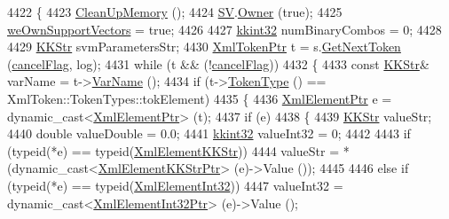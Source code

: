 \begin{DoxyCode}
4422 \{
4423   \hyperlink{struct_s_v_m289___m_f_s_1_1_svm___model_a38e71bae1b5829f722cbcb19eb3930b1}{CleanUpMemory} ();
4424   \hyperlink{struct_s_v_m289___m_f_s_1_1_svm___model_ab2ebe759ca5aabb85fc6deea03706f0a}{SV}.\hyperlink{class_k_k_b_1_1_k_k_queue_a4990d037ff09dd504cc7df53819bf61a}{Owner} (\textcolor{keyword}{true});
4425   \hyperlink{struct_s_v_m289___m_f_s_1_1_svm___model_a92c6022c1bf0e7094d7815692f3ec0e9}{weOwnSupportVectors} = \textcolor{keyword}{true};
4426 
4427   \hyperlink{namespace_k_k_b_a8fa4952cc84fda1de4bec1fbdd8d5b1b}{kkint32}  numBinaryCombos = 0;
4428 
4429   \hyperlink{class_k_k_b_1_1_k_k_str}{KKStr}  svmParametersStr;
4430   \hyperlink{class_k_k_b_1_1_xml_token}{XmlTokenPtr}  t = s.\hyperlink{class_k_k_b_1_1_xml_stream_a87cc738b05c666cf5d5c25beaab477b4}{GetNextToken} (\hyperlink{struct_s_v_m289___m_f_s_1_1_svm___model_a01645368f6800875543d69ce8731d692}{cancelFlag}, log);
4431   \textcolor{keywordflow}{while}  (t  &&  (!\hyperlink{struct_s_v_m289___m_f_s_1_1_svm___model_a01645368f6800875543d69ce8731d692}{cancelFlag}))
4432   \{
4433     \textcolor{keyword}{const} \hyperlink{class_k_k_b_1_1_k_k_str}{KKStr}& varName = t->\hyperlink{class_k_k_b_1_1_xml_token_a28b39cfdfa2ed63048a812b1cb52263c}{VarName} ();
4434     \textcolor{keywordflow}{if}  (t->\hyperlink{class_k_k_b_1_1_xml_token_ae98e2c1a798882647578cae4adcd7176}{TokenType} () == XmlToken::TokenTypes::tokElement)
4435     \{
4436       \hyperlink{class_k_k_b_1_1_xml_element}{XmlElementPtr} e = \textcolor{keyword}{dynamic\_cast<}\hyperlink{class_k_k_b_1_1_xml_element}{XmlElementPtr}\textcolor{keyword}{>} (t);
4437       \textcolor{keywordflow}{if}  (e)
4438       \{
4439         \hyperlink{class_k_k_b_1_1_k_k_str}{KKStr}  valueStr;
4440         \textcolor{keywordtype}{double}  valueDouble = 0.0;
4441         \hyperlink{namespace_k_k_b_a8fa4952cc84fda1de4bec1fbdd8d5b1b}{kkint32}  valueInt32 = 0;
4442 
4443         \textcolor{keywordflow}{if}  (\textcolor{keyword}{typeid}(*e) == \textcolor{keyword}{typeid}(\hyperlink{class_k_k_b_1_1_xml_element_k_k_str}{XmlElementKKStr}))
4444           valueStr = *(\textcolor{keyword}{dynamic\_cast<}\hyperlink{class_k_k_b_1_1_xml_element_k_k_str}{XmlElementKKStrPtr}\textcolor{keyword}{>} (e)->Value ());
4445 
4446         \textcolor{keywordflow}{else} \textcolor{keywordflow}{if}  (\textcolor{keyword}{typeid}(*e) == \textcolor{keyword}{typeid}(\hyperlink{class_k_k_b_1_1_xml_element_int32}{XmlElementInt32}))
4447           valueInt32 = \textcolor{keyword}{dynamic\_cast<}\hyperlink{class_k_k_b_1_1_xml_element_int32}{XmlElementInt32Ptr}\textcolor{keyword}{>} (e)->Value ();

\end{DoxyCode}
